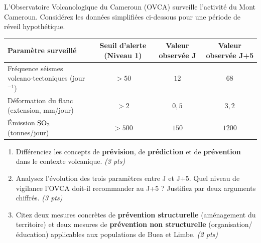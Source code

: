 \documentclass[11pt]{article}
\begin{document}
\begin{exercice}
L'Observatoire Volcanologique du Cameroun (OVCA) surveille l'activité du Mont Cameroun. Considérez les données simplifiées ci-dessous pour une période de réveil hypothétique.

\begin{tabular}{lccc}
\toprule
\textbf{Paramètre surveillé} & \textbf{Seuil d'alerte (Niveau 1)} & \textbf{Valeur observée J} & \textbf{Valeur observée J+5} \\
\midrule
Fréquence séismes volcano-tectoniques (jour$^{-1}$) & $> 50$ & $12$ & $68$ \\
Déformation du flanc (extension, mm/jour) & $> 2$ & $0,5$ & $3,2$ \\
Émission $\ce{SO2}$ (tonnes/jour) & $> 500$ & $150$ & $1200$ \\
\bottomrule
\end{tabular}

\begin{enumerate}
    \item Différenciez les concepts de \textbf{prévision}, de \textbf{prédiction} et de \textbf{prévention} dans le contexte volcanique. \textit{(3 pts)}
    \item Analysez l'évolution des trois paramètres entre J et J+5. Quel niveau de vigilance l'OVCA doit-il recommander au J+5 ? Justifiez par deux arguments chiffrés. \textit{(3 pts)}
    \item Citez deux mesures concrètes de \textbf{prévention structurelle} (aménagement du territoire) et deux mesures de \textbf{prévention non structurelle} (organisation/éducation) applicables aux populations de Buea et Limbe. \textit{(2 pts)}
\end{enumerate}
\end{exercice}
\end{document}
